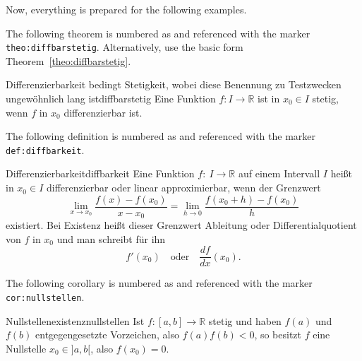 Now, everything is prepared for the following examples.

\begin{dispExample}
The following theorem is numbered as 
and referenced with the marker \texttt{theo:diffbarstetig}.
Alternatively, use the basic form Theorem~\ref{theo:diffbarstetig}.

\begin{Theorem}{Differenzierbarkeit bedingt Stetigkeit, wobei diese Benennung
  zu Testzwecken ungew\"{o}hnlich lang ist}{diffbarstetig}%
  Eine Funktion $f:I\to\mathbb{R}$ ist in $x_0\in I$ stetig, wenn $f$ in
  $x_0$ differenzierbar ist.
\end{Theorem}
\end{dispExample}


\begin{dispExample}
The following definition is numbered as  and
referenced with the marker \texttt{def:diffbarkeit}.\bigskip

\begin{Definition}{Differenzierbarkeit}{diffbarkeit}
  Eine Funktion $f:~I\to\mathbb{R}$ auf einem Intervall $I$ hei\ss{}t in
  $x_0\in I$ differenzierbar oder linear approximierbar,
  wenn der Grenzwert
  \begin{equation*}
  \lim\limits_{x\to x_0}\frac{f(x)-f(x_0)}{x-x_0}=
  \lim\limits_{h\to 0}\frac{f(x_0+h)-f(x_0)}{h}
  \end{equation*}
  existiert. Bei Existenz hei\ss{}t dieser Grenzwert Ableitung
  oder Differentialquotient von $f$ in $x_0$ und man
  schreibt f\"{u}r ihn
  \begin{equation*}
  f'(x_0)\quad\text{oder}\quad\frac{df}{dx}(x_0).
  \end{equation*}
\end{Definition}
\end{dispExample}


\begin{dispExample}
The following corollary is numbered as  and
referenced with the marker \texttt{cor:nullstellen}.\bigskip

\begin{Corollary}{Nullstellenexistenz}{nullstellen}
  Ist $f:[a,b]\to\mathbb{R}$ stetig und haben $f(a)$ und $f(b)$ entgegengesetzte
  Vorzeichen, also $f(a)f(b)<0$, so besitzt $f$ eine Nullstelle $x_0\in]a,b[$,
  also $f(x_0)=0$.
\end{Corollary}
\end{dispExample}


